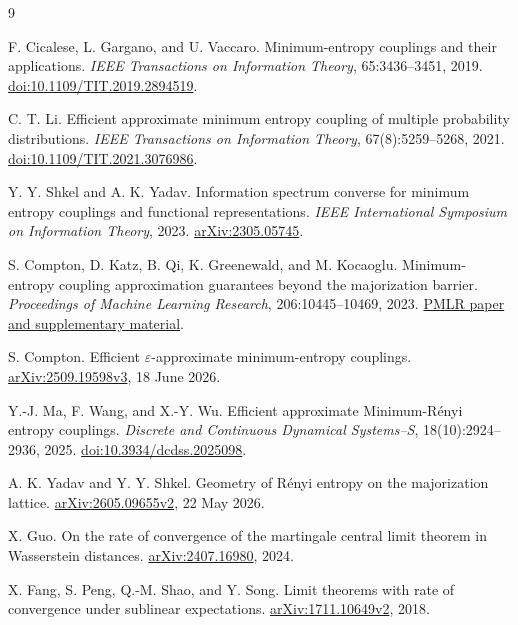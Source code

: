\documentclass[11pt,a4paper]{article}
\numberwithin{equation}{section}
\begin{document}
\begin{thebibliography}{9}\small\raggedright\setlength{\itemsep}{4pt}
F. Cicalese, L. Gargano, and U. Vaccaro.
Minimum-entropy couplings and their applications.
\emph{IEEE Transactions on Information Theory}, 65:3436--3451, 2019.
\href{https://doi.org/10.1109/TIT.2019.2894519}{doi:10.1109/TIT.2019.2894519}.

C. T. Li.
Efficient approximate minimum entropy coupling of multiple probability
distributions.
\emph{IEEE Transactions on Information Theory}, 67(8):5259--5268, 2021.
\href{https://doi.org/10.1109/TIT.2021.3076986}{doi:10.1109/TIT.2021.3076986}.

Y. Y. Shkel and A. K. Yadav.
Information spectrum converse for minimum entropy couplings and functional
representations.
\emph{IEEE International Symposium on Information Theory}, 2023.
\href{https://arxiv.org/abs/2305.05745}{arXiv:2305.05745}.

S. Compton, D. Katz, B. Qi, K. Greenewald, and M. Kocaoglu.
Minimum-entropy coupling approximation guarantees beyond the majorization
barrier.
\emph{Proceedings of Machine Learning Research}, 206:10445--10469, 2023.
\href{https://proceedings.mlr.press/v206/compton23a.html}{PMLR paper and supplementary material}.

S. Compton.
Efficient $\varepsilon$-approximate minimum-entropy couplings.
\href{https://arxiv.org/abs/2509.19598v3}{arXiv:2509.19598v3},
18 June 2026.

Y.-J. Ma, F. Wang, and X.-Y. Wu.
Efficient approximate Minimum-R\'enyi entropy couplings.
\emph{Discrete and Continuous Dynamical Systems--S}, 18(10):2924--2936, 2025.
\href{https://doi.org/10.3934/dcdss.2025098}{doi:10.3934/dcdss.2025098}.

A. K. Yadav and Y. Y. Shkel.
Geometry of R\'enyi entropy on the majorization lattice.
\href{https://arxiv.org/abs/2605.09655v2}{arXiv:2605.09655v2},
22 May 2026.

X. Guo.
On the rate of convergence of the martingale central limit theorem in
Wasserstein distances.
\href{https://arxiv.org/abs/2407.16980}{arXiv:2407.16980}, 2024.

X. Fang, S. Peng, Q.-M. Shao, and Y. Song.
Limit theorems with rate of convergence under sublinear expectations.
\href{https://arxiv.org/abs/1711.10649v2}{arXiv:1711.10649v2}, 2018.
\end{thebibliography}
\end{document}
